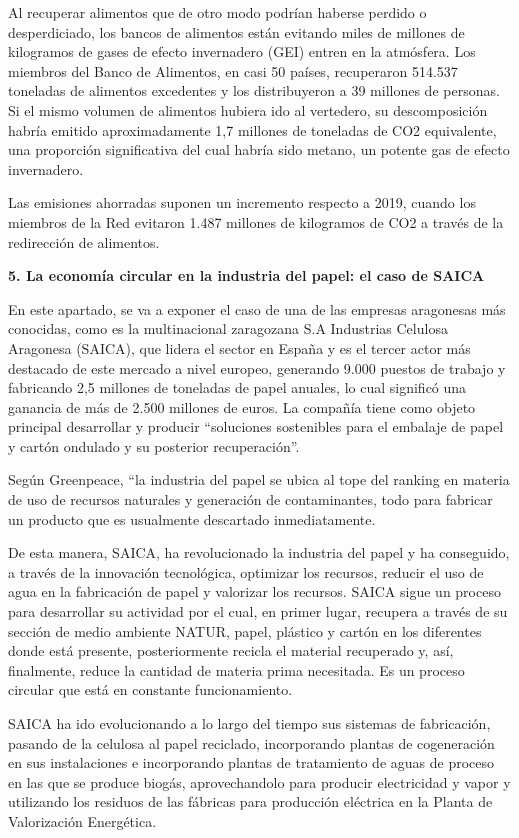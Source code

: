 \documentclass[runningheads]{llncs}
\begin{document}
Al recuperar alimentos que de otro modo podrían haberse perdido o desperdiciado, los bancos de alimentos están evitando miles de millones de kilogramos de gases de efecto invernadero (GEI) entren en la atmósfera.
Los miembros del Banco de Alimentos, en casi 50 países, recuperaron 514.537 toneladas de alimentos excedentes y los distribuyeron a 39 millones de personas. Si el mismo volumen de alimentos hubiera ido al vertedero, su descomposición habría emitido aproximadamente 1,7 millones de toneladas de CO2 equivalente, una proporción significativa del cual habría sido metano, un potente gas de efecto invernadero.

Las emisiones ahorradas suponen un incremento respecto a 2019, cuando los miembros de la Red evitaron 1.487 millones de kilogramos de CO2 a través de la redirección de alimentos.

\textbf{5. La economía circular en la industria del papel: el caso de SAICA}

En este apartado, se va a exponer el caso de una de las empresas aragonesas más conocidas, como es la multinacional zaragozana S.A Industrias Celulosa Aragonesa (SAICA), que lidera el sector en España y es el tercer actor más destacado de este mercado a nivel europeo, generando 9.000 puestos de trabajo y fabricando 2,5 millones de toneladas de papel anuales, lo cual significó una ganancia de más de 2.500 millones de euros. La compañía tiene como objeto principal desarrollar y producir “soluciones sostenibles para el embalaje de papel y cartón ondulado y su posterior recuperación”.

Según Greenpeace, “la industria del papel se ubica al tope del ranking en materia de uso de recursos naturales y generación de contaminantes, todo para fabricar un producto que es usualmente descartado inmediatamente. 

De esta manera, SAICA, ha revolucionado la industria del papel y ha conseguido, a través de la innovación tecnológica, optimizar los recursos, reducir el uso de agua en la fabricación de papel y valorizar los recursos. SAICA sigue un proceso para desarrollar su actividad por el cual, en primer lugar, recupera a través de su sección de medio ambiente NATUR, papel, plástico y cartón en los diferentes donde está presente, posteriormente recicla el material recuperado y, así, finalmente, reduce la cantidad de materia prima necesitada. Es un proceso circular que está en constante funcionamiento.

SAICA ha ido evolucionando a lo largo del tiempo sus sistemas de fabricación, pasando de la celulosa al papel reciclado, incorporando plantas de cogeneración en sus instalaciones e incorporando plantas de tratamiento de aguas de proceso en las que se produce biogás, aprovechandolo para producir electricidad y vapor y utilizando los residuos de las fábricas para producción eléctrica en la Planta de Valorización Energética.
\end{document}
